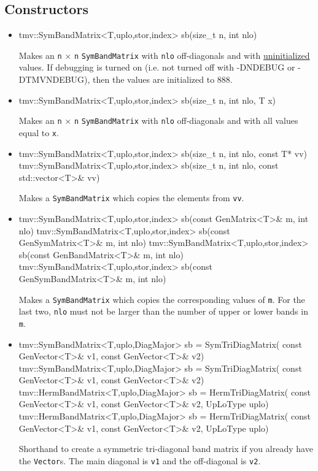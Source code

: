 \documentclass[twoside,letterpaper,11pt]{article}
\renewcommand{\tt}[1]{{\lstinline {#1}}}
\begin{document}
\subsection{Constructors}
\label{SymBandMatrix_Constructors}

\begin{itemize}
\item 
\begin{tmvcode}
tmv::SymBandMatrix<T,uplo,stor,index> sb(size_t n, int nlo)
\end{tmvcode}
Makes an \tt{n} $\times$ \tt{n} \tt{SymBandMatrix} with 
\tt{nlo} off-diagonals
and with \underline{uninitialized} values.
If debugging is turned on (i.e. not turned off 
with -DNDEBUG or -DTMVNDEBUG), then the values are initialized to 888.

\item
\begin{tmvcode}
tmv::SymBandMatrix<T,uplo,stor,index> sb(size_t n, int nlo, T x)
\end{tmvcode}
Makes an \tt{n} $\times$ \tt{n} \tt{SymBandMatrix} with \tt{nlo} off-diagonals
and with all values equal to \tt{x}.

\item
\begin{tmvcode}
tmv::SymBandMatrix<T,uplo,stor,index> sb(size_t n, int nlo, 
      const T* vv)
tmv::SymBandMatrix<T,uplo,stor,index> sb(size_t n, int nlo, 
      const std::vector<T>& vv)
\end{tmvcode}
Makes a \tt{SymBandMatrix} which copies the elements from \tt{vv}.  

\item 
\begin{tmvcode}
tmv::SymBandMatrix<T,uplo,stor,index> sb(const GenMatrix<T>& m, 
      int nlo)
tmv::SymBandMatrix<T,uplo,stor,index> sb(const GenSymMatrix<T>& m, 
      int nlo)
tmv::SymBandMatrix<T,uplo,stor,index> sb(const GenBandMatrix<T>& m, 
      int nlo)
tmv::SymBandMatrix<T,uplo,stor,index> sb(const GenSymBandMatrix<T>& m, 
      int nlo)
\end{tmvcode}
Makes a \tt{SymBandMatrix} which copies the corresponding values of \tt{m}.  
For the last two, \tt{nlo} must not be larger than the number of upper
or lower bands in \tt{m}.

\item
\begin{tmvcode}
tmv::SymBandMatrix<T,uplo,DiagMajor> sb = SymTriDiagMatrix(
      const GenVector<T>& v1, const GenVector<T>& v2)
tmv::SymBandMatrix<T,uplo,DiagMajor> sb = SymTriDiagMatrix(
      const GenVector<T>& v1, const GenVector<T>& v2)
tmv::HermBandMatrix<T,uplo,DiagMajor> sb = HermTriDiagMatrix(
      const GenVector<T>& v1, const GenVector<T>& v2, 
      UpLoType uplo)
tmv::HermBandMatrix<T,uplo,DiagMajor> sb = HermTriDiagMatrix(
      const GenVector<T>& v1, const GenVector<T>& v2, 
      UpLoType uplo)
\end{tmvcode}
Shorthand to create a symmetric tri-diagonal band matrix
if you already have the \tt{Vector}s.  
The main diagonal is \tt{v1} and the off-diagonal is \tt{v2}.


\end{itemize}
\end{document}
